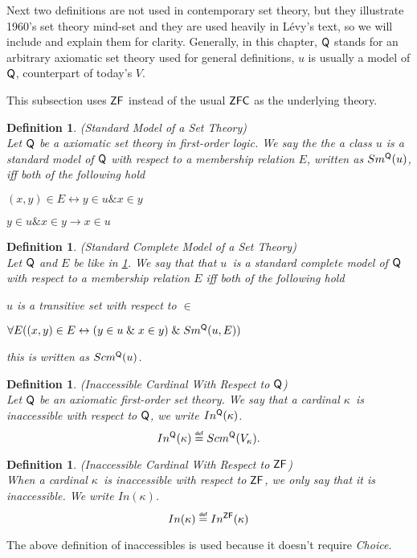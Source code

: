 \documentclass[12pt,a4paper]{article}
\newtheorem{definition}[theorem]{Definition}
\renewcommand{\iff}{\leftrightarrow}
\newcommand{\then}{\rightarrow}
\newcommand{\bce}{\begin{compactenum}}
\newcommand{\ece}{\end{compactenum}}
\newcommand{\et}{\mathrel{\&}}
\newcommand\defeq{\mathrel{\overset{\makebox[0pt]{\mbox{\normalfont\tiny\sffamily def}}}{=}}}
\begin{document}
Next two definitions are not used in contemporary set theory, but they illustrate 1960's set theory mind-set and they are used heavily in Lévy's text, so we will include and explain them for clarity. Generally, in this chapter, $\sf{Q}$ stands for an arbitrary axiomatic set theory used for general definitions, $u$ is usually a model of $\sf{Q}$, counterpart of today's $V$.

This subsection uses $\sf{ZF}$ instead of the usual $\sf{ZFC}$ as the underlying theory.

\begin{definition}{(Standard Model of a Set Theory)}\label{def:sm_q}\\
Let $\sf{Q}$ be a axiomatic set theory in first-order logic. We say the the a class $u$ is a standard model of $\sf{Q}$ with respect to a membership relation $E$, written as $Sm^{\sf{Q}}(u)$, iff both of the following hold
\bce[(i)]
\item $(x, y) \in E \iff y \in u \et x \in y$
\item $y \in u \et x \in y \then x \in u$
\ece
\end{definition}
\begin{definition}{(Standard Complete Model of a Set Theory)}\label{def:scm_q}\\
Let $\sf{Q}$ and $E$ be like in \ref{def:sm_q}. We say that that $u$ is a standard complete model of $\sf{Q}$ with respect to a membership relation $E$ iff both of the following hold
\bce[(i)]
\item $u$ is a transitive set with respect to $\in$
\item $\forall E ((x, y) \in E \iff (y \in u \et x \in y) \et Sm^{\sf{Q}}(u, E))$
\ece
this is written as $Scm^{\sf{Q}}(u)$.
\end{definition}

\begin{definition}{(Inaccessible Cardinal With Respect to $\sf{Q}$)}\label{def:levy_inaccessible_q}\\
Let $\sf{Q}$ be an axiomatic first-order set theory. We say that a cardinal $\kappa$ is inaccessible with respect to $\sf{Q}$, we write $In^{\sf{Q}}(\kappa)$.
\begin{equation}
In^{\sf{Q}}(\kappa) \defeq Scm^{\sf{Q}}(V_\kappa).
\end{equation}
\end{definition}

\begin{definition}{(Inaccessible Cardinal With Respect to $\sf{ZF}$)}\label{def:levy_inaccessible}\\
When a cardinal $\kappa$ is inaccessible with respect to $\sf{ZF}$, we only say that it is inaccessible. We write $In(\kappa)$.
\begin{equation}
In(\kappa) \defeq In^{\sf{ZF}}(\kappa)
\end{equation}
\end{definition}
The above definition of inaccessibles is used because it doesn't require \emph{Choice}.
\end{document}
